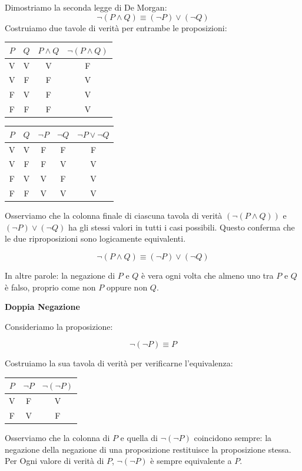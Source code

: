 \begin{esempio} Dimostriamo la seconda legge di De Morgan: \[
\neg (P \land Q) \equiv (\neg P) \lor (\neg Q)
\]
Costruiamo due tavole di verità per entrambe le proposizioni:

\begin{center}
\begin{tabular}{c|c|c|c}
  \(P\) & \(Q\) & \(P \land Q\) & \(\neg (P \land Q)\) \\
  \hline
  V & V & V & F  \\
  V & F & F & V   \\
  F & V & F & V    \\
  F & F & F & V     \\
\end{tabular}
\end{center}

\begin{center}
\begin{tabular}{c|c|c|c|c}
  \(P\) & \(Q\) & \(\neg P\) & \(\neg Q\) & \(\neg P \lor \neg Q\) \\
  \hline
  V & V & F & F & F \\
  V & F & F & V & V  \\
  F & V & V & F & V  \\
  F & F & V & V & V  \\
\end{tabular}
\end{center}
Osserviamo che la colonna finale di ciascuna tavola di verità \( (\neg(P\land Q))  \) e \( (\neg P) \lor (\neg Q) \) ha gli stessi valori in tutti i casi possibili. Questo conferma che le due riproposizioni sono logicamente equivalenti.

\[
\neg (P \land Q) \equiv (\neg P) \lor (\neg Q)
\]

In altre parole: la negazione di \(P\) e \(Q\) è vera ogni volta che almeno uno tra \(P\) e \(Q\) è falso, proprio come non \(P\) oppure non \(Q\).
\end{esempio}



\begin{esempio} \textbf{Doppia Negazione}
\medskip

Consideriamo la proposizione:

\[
\neg(\neg P) \equiv P
\]

Costruiamo la sua tavola di verità per verificarne l'equivalenza:
\begin{center}
\begin{tabular}{c|c|c}
  \(P\) & \(\neg P\) & \(\neg(\neg P)\) \\
  \hline
  V & F & V \\
  F & V & F \\
\end{tabular}
\end{center}
Osserviamo che la colonna di $P$ e quella di \( \neg(\neg P)\) coincidono sempre:  la negazione della negazione di una proposizione restituisce la proposizione stessa. Per Ogni valore di verità di \(P\), \( \neg(\neg P)\) è sempre equivalente a \(P\).
\end{esempio}



